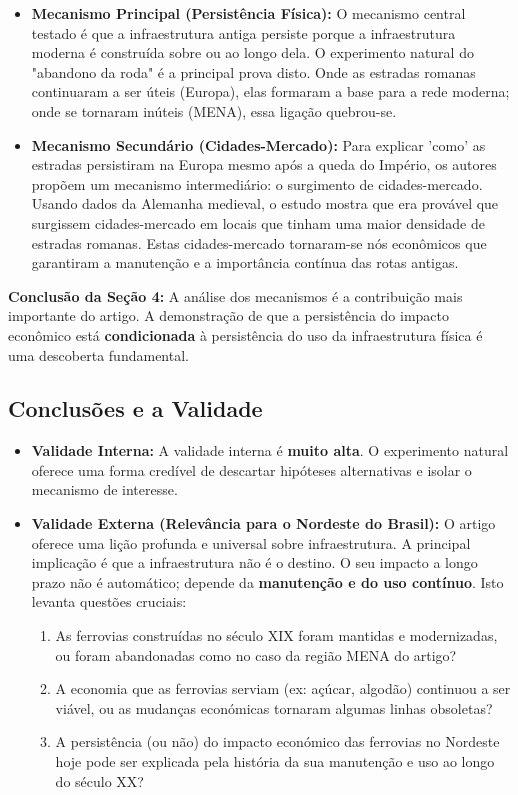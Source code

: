 \documentclass[12pt, a4paper]{article}
\begin{document}
\begin{itemize}
    \item \textbf{Mecanismo Principal (Persistência Física):} O mecanismo central testado é que a infraestrutura antiga persiste porque a infraestrutura moderna é construída sobre ou ao longo dela. O experimento natural do "abandono da roda" é a principal prova disto. Onde as estradas romanas continuaram a ser úteis (Europa), elas formaram a base para a rede moderna; onde se tornaram inúteis (MENA), essa ligação quebrou-se.
    \item \textbf{Mecanismo Secundário (Cidades-Mercado):} Para explicar 'como' as estradas persistiram na Europa mesmo após a queda do Império, os autores propõem um mecanismo intermediário: o surgimento de cidades-mercado. Usando dados da Alemanha medieval, o estudo mostra que era provável que surgissem cidades-mercado em locais que tinham uma maior densidade de estradas romanas. Estas cidades-mercado tornaram-se nós econômicos que garantiram a manutenção e a importância contínua das rotas antigas.
\end{itemize}

\noindent\textbf{Conclusão da Seção 4:} A análise dos mecanismos é a contribuição mais importante do artigo. A demonstração de que a persistência do impacto econômico está \textbf{condicionada} à persistência do uso da infraestrutura física é uma descoberta fundamental.

\subsection{Conclusões e a Validade}
\begin{itemize}
    \item \textbf{Validade Interna:} A validade interna é \textbf{muito alta}. O experimento natural oferece uma forma credível de descartar hipóteses alternativas e isolar o mecanismo de interesse.
    \item \textbf{Validade Externa (Relevância para o Nordeste do Brasil):} O artigo oferece uma lição profunda e universal sobre infraestrutura. A principal implicação é que a infraestrutura não é o destino. O seu impacto a longo prazo não é automático; depende da \textbf{manutenção e do uso contínuo}. Isto levanta questões cruciais:
        \begin{enumerate}
            \item As ferrovias construídas no século XIX foram mantidas e modernizadas, ou foram abandonadas como no caso da região MENA do artigo?
            \item A economia que as ferrovias serviam (ex: açúcar, algodão) continuou a ser viável, ou as mudanças económicas tornaram algumas linhas obsoletas?
            \item A persistência (ou não) do impacto económico das ferrovias no Nordeste hoje pode ser explicada pela história da sua manutenção e uso ao longo do século XX?
        \end{enumerate}
\end{itemize}
\end{document}
